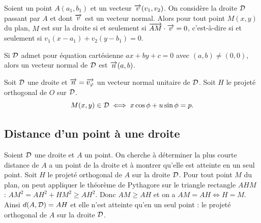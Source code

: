 \begin{prop}
  Soient un point \(A(a_1 , b_1)\) et un vecteur \(\overrightarrow{v}(v_1 , v_2)\). On 
  considère la droite \(\mathcal{D}\) passant par \(A\) et dont \(\overrightarrow{v}\) est un vecteur 
  normal.  Alors pour tout point \(M(x , y)\) du plan, \(M\) est sur la droite 
  si et seulement si \(\overrightarrow{AM}\cdot\overrightarrow{v} = 0\), c'est-à-dire si et seulement 
  si \(v_1(x - a_1) + v_2(y - b_1) = 0\).
\end{prop}

Si \(\mathcal{D}\) admet pour équation cartésienne \(ax + by + c = 0\) avec \((a , b) 
\neq (0 , 0)\), alors un vecteur normal de \(\mathcal{D}\) est \(\overrightarrow{n}(a , b)\).

\begin{prop}
  Soit \(\mathcal{D}\) une droite et \(\overrightarrow{n} = \overrightarrow{v_\varphi}\) un vecteur normal 
  unitaire de \(\mathcal{D}\). Soit \(H\) le projeté orthogonal de \(O\) sur \(\mathcal{D}\).
  \begin{equation}
    M(x , y) \in \mathcal{D} \iff x\cos\phi + u \sin\phi = p.
  \end{equation}
\end{prop}

\subsection{Distance d'un point à une droite}

Soient \(\mathcal{D}\) une droite et \(A\) un point. On cherche à déterminer la plus 
courte distance de \(A\) a un point de la droite et à montrer qu'elle est 
atteinte en un seul point. Soit \(H\) le projeté orthogonal de \(A\) sur la 
droite \(\mathcal{D}\). Pour tout point \(M\) du plan, on peut appliquer le théorème 
de Pythagore sur le triangle rectangle \(AHM\) : \(AM^2 = AH^2 + HM^2 
\geqslant AH^2\). Donc \(AM \geqslant AH\) et on a \(AM = AH \iff H = M\). 
Ainsi \(d(A , \mathcal{D}) = AH\) et elle n'est atteinte qu'en un seul point : le 
projeté orthogonal de \(A\) sur la droite \(\mathcal{D}\).

